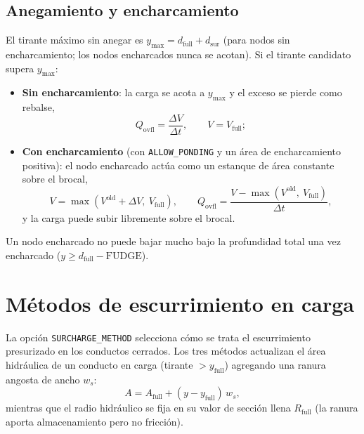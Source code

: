 \documentclass[11pt,a4paper]{article}
\begin{document}
\subsection{Anegamiento y encharcamiento}

El tirante máximo sin anegar es $y_{\max} = d_{\mathrm{full}} + d_{\mathrm{sur}}$
(para nodos sin encharcamiento; los nodos encharcados nunca se acotan). Si el
tirante candidato supera $y_{\max}$:
\begin{itemize}[nosep]
  \item \textbf{Sin encharcamiento}: la carga se acota a $y_{\max}$ y el exceso
        se pierde como rebalse,
        \begin{equation}
          Q_{\mathrm{ovfl}} = \frac{\Delta V}{\Delta t}, \qquad
          V = V_{\mathrm{full}};
        \end{equation}
  \item \textbf{Con encharcamiento} (con \texttt{ALLOW\_PONDING} y un área de
        encharcamiento positiva): el nodo encharcado actúa como un estanque de
        área constante sobre el brocal,
        \begin{equation}
          V = \max\left(V^{\mathrm{old}} + \Delta V,\ V_{\mathrm{full}}\right), \qquad
          Q_{\mathrm{ovfl}} = \frac{V - \max(V^{\mathrm{old}},\ V_{\mathrm{full}})}
            {\Delta t},
        \end{equation}
        y la carga puede subir libremente sobre el brocal.
\end{itemize}
Un nodo encharcado no puede bajar mucho bajo la profundidad total una vez
encharcado ($y \ge d_{\mathrm{full}} - \mathrm{FUDGE}$).

\section{Métodos de escurrimiento en carga}

La opción \texttt{SURCHARGE\_METHOD} selecciona cómo se trata el escurrimiento
presurizado en los conductos cerrados. Los tres métodos actualizan el área
hidráulica de un conducto en carga (tirante $> y_{\mathrm{full}}$) agregando
una ranura angosta de ancho $w_s$:
\begin{equation}
  A = A_{\mathrm{full}} + (y - y_{\mathrm{full}})\,w_s,
\end{equation}
mientras que el radio hidráulico se fija en su valor de sección llena
$R_{\mathrm{full}}$ (la ranura aporta almacenamiento pero no fricción).
\end{document}
